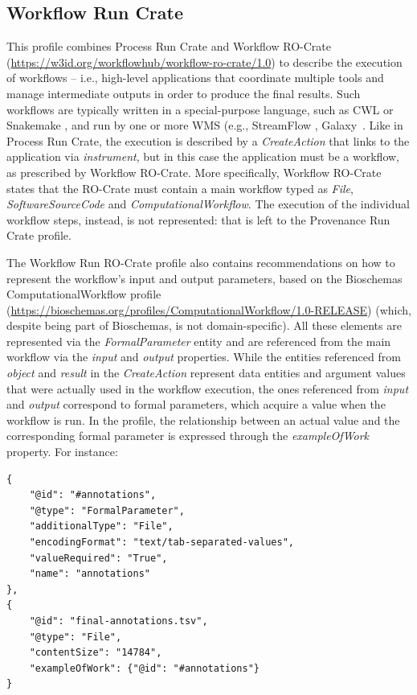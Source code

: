 \documentclass[10pt,letterpaper]{article}
\begin{document}
\subsection{Workflow Run Crate}\label{workflow-run-crate}

This profile combines Process Run Crate and Workflow RO-Crate (\url{https://w3id.org/workflowhub/workflow-ro-crate/1.0}) to describe the execution of workflows -- i.e., high-level applications that coordinate multiple tools and manage intermediate outputs in order to produce the final results.
Such workflows are typically written in a special-purpose language, such as CWL or Snakemake
\cite{Koster 2012}, and run by one or more WMS (e.g., StreamFlow
\cite{Streamflow}, Galaxy~\cite{Galaxy 2022}.
Like in Process Run Crate, the execution is described by a \emph{CreateAction}
that links to the application via \emph{instrument}, but in this case the application must be a workflow, as prescribed by Workflow RO-Crate.
More specifically, Workflow RO-Crate states that the RO-Crate must contain a main workflow typed as \emph{File}, \emph{SoftwareSourceCode}
and \emph{ComputationalWorkflow}.
The execution of the individual workflow steps, instead, is not represented: that is left to the Provenance Run Crate profile.

The Workflow Run RO-Crate profile also contains recommendations on how to represent the workflow's input and output parameters, based on the Bioschemas~\cite{Gray 2017} ComputationalWorkflow profile (\url{https://bioschemas.org/profiles/ComputationalWorkflow/1.0-RELEASE}) (which, despite being part of Bioschemas, is not domain-specific).
All these elements are represented via the \emph{FormalParameter} entity and are referenced from the main workflow via the \emph{input} and
\emph{output} properties.
While the entities referenced from
\emph{object} and \emph{result} in the \emph{CreateAction} represent data entities and argument values that were actually used in the workflow execution, the ones referenced from \emph{input} and
\emph{output} correspond to formal parameters, which acquire a value when the workflow is run.
In the profile, the relationship between an actual value and the corresponding formal parameter is expressed through the \emph{exampleOfWork} property.
For instance:

\begin{verbatim}
{
    "@id": "#annotations",
    "@type": "FormalParameter",
    "additionalType": "File",
    "encodingFormat": "text/tab-separated-values",
    "valueRequired": "True",
    "name": "annotations"
},
{
    "@id": "final-annotations.tsv",
    "@type": "File",
    "contentSize": "14784",
    "exampleOfWork": {"@id": "#annotations"}
}
\end{verbatim}
\end{document}
